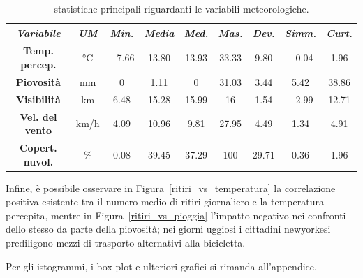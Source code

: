 \begin{table}[htp]
	\centering
	\renewcommand\arraystretch{1.5}
	\begin{tabular}{c|c|c|c|c|c|c|c|c}
		\hline
		\textit{Variabile} & \textit{UM} & \textit{Min.} & \textit{Media} & \textit{Med.} & \textit{Mas.} & \textit{Dev.} & \textit{Simm.}  & \textit{Curt.} \\
		\hline
		\textbf{Temp. percep.} & \unit{\degreeCelsius} & \num{-7.66} & \num{13.80} & \num{13.93} & \num{33.33} & \num{9.80} & \num{-0.04} & \num{1.96} \\
		\hline
		\textbf{Piovosità} & \unit{\milli\meter} & \num{0} & \num{1.11} & \num{0} & \num{31.03} & \num{3.44} & \num{5.42} & \num{38.86} \\
		\hline
		\textbf{Visibilità} & \si{\kilo\meter} & \num{6.48} & \num{15.28} & \num{15.99} & \num{16} & \num{1.54} & \num{-2.99} & \num{12.71} \\
		\hline
		\textbf{Vel. del vento} & \si{\kilo\meter/\hour} & \num{4.09} & \num{10.96} & \num{9.81} & \num{27.95} & \num{4.49} & \num{1.34} & \num{4.91} \\
		\hline
		\textbf{Copert. nuvol.} & \si{\percent} & \num{0.08} & \num{39.45} & \num{37.29} & \num{100} & \num{29.71} & \num{0.36} & \num{1.96} \\
		\hline
	\end{tabular}
	\caption[Statistiche principali riguardanti le variabili meteorologiche]{statistiche principali riguardanti le variabili meteorologiche.}
	\label{statistiche_variabili_meteo}
\end{table}

\par Infine, è possibile osservare in Figura~\ref{ritiri_vs_temperatura} la correlazione positiva esistente tra il numero medio di ritiri giornaliero e la temperatura percepita, mentre in Figura~\ref{ritiri_vs_pioggia} l'impatto negativo nei confronti dello stesso da parte della piovosità; nei giorni uggiosi i cittadini newyorkesi prediligono mezzi di trasporto alternativi alla bicicletta.
\par Per gli istogrammi, i box-plot e ulteriori grafici si rimanda all'appendice.

